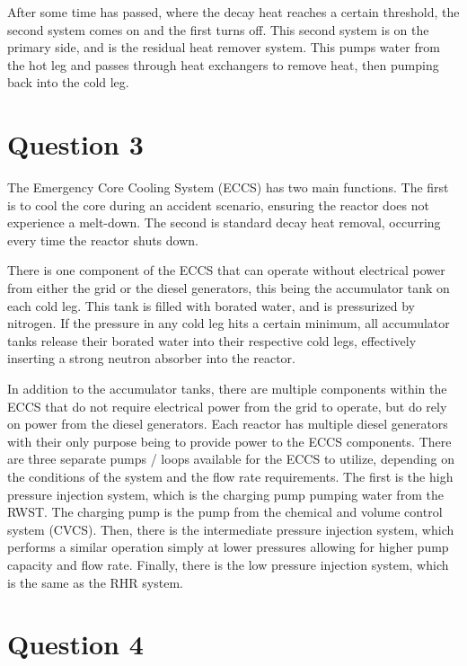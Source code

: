\documentclass{article}
\begin{document}
After some time has passed, where the decay heat reaches a certain threshold, the second system comes on and the first turns off. This second system is on the primary side, and is the residual heat remover system. This pumps water from the hot leg and passes through heat exchangers to remove heat, then pumping back into the cold leg. 

\section*{Question 3}

The Emergency Core Cooling System (ECCS) has two main functions. The first is to cool the core during an accident scenario, ensuring the reactor does not experience a melt-down. The second is standard decay heat removal, occurring every time the reactor shuts down. 

There is one component of the ECCS that can operate without electrical power from either the grid or the diesel generators, this being the accumulator tank on each cold leg. This tank is filled with borated water, and is pressurized by nitrogen. If the pressure in any cold leg hits a certain minimum, all accumulator tanks release their borated water into their respective cold legs, effectively inserting a strong neutron absorber into the reactor. 

In addition to the accumulator tanks, there are multiple components within the ECCS that do not require electrical power from the grid to operate, but do rely on power from the diesel generators. Each reactor has multiple diesel generators with their only purpose being to provide power to the ECCS components. There are three separate pumps / loops available for the ECCS to utilize, depending on the conditions of the system and the flow rate requirements. The first is the high pressure injection system, which is the charging pump pumping water from the RWST. The charging pump is the pump from the chemical and volume control system (CVCS). Then, there is the intermediate pressure injection system, which performs a similar operation simply at lower pressures allowing for higher pump capacity and flow rate. Finally, there is the low pressure injection system, which is the same as the RHR system.

\section*{Question 4}
\end{document}
